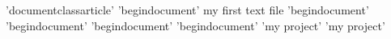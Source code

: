 ’documentclass{article}’
’begin{document}’
my first text file
’begin{document}’
’begin{document}’
’begin{document}’
’begin{document}’
’my project’
’my project’
